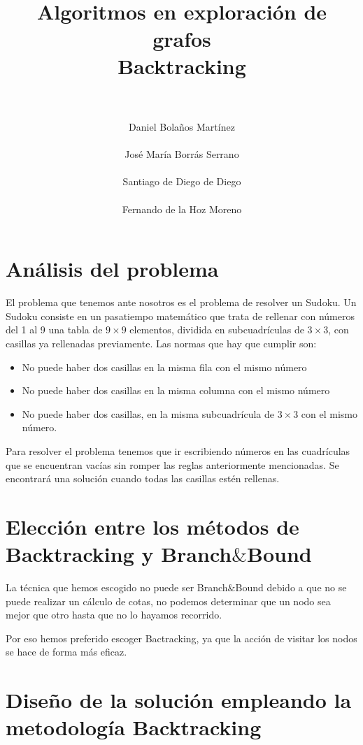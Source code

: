 \documentclass[11pt, a4paper]{article}
\title{
  \normalfont \normalsize 
  \textsc{} \\ [25pt]    %
  \horrule{0.5pt} \\[0.4cm] %
  \huge Algoritmos en exploración de grafos\\ \Large{Backtracking}\\ %
  \horrule{2pt} \\[0.5cm] %
}
\author{\Large{Daniel Bolaños Martínez} 
\\\\
\Large{José María Borrás Serrano}
\\\\
\Large{Santiago de Diego de Diego}
\\\\
\Large{Fernando de la Hoz Moreno}}
\date{\vspace{-1.5em} \normalsize }
\theoremstyle{theorem-style}
\theoremstyle{definition-style}
\theoremstyle{remark-style}
\theoremstyle{example-style}
\begin{document}
\maketitle  %
\vfill
\begin{center}
\end{center}
\newpage
\newpage

\section{Análisis del problema}
El problema que tenemos ante nosotros es el problema de resolver un Sudoku. Un Sudoku consiste en un pasatiempo matemático que trata de rellenar con números del 1 al 9 una tabla de $9\times 9$ elementos, dividida en subcuadrículas de $3\times 3$, con casillas ya rellenadas previamente. Las normas que hay que cumplir son:
\begin{itemize}
\item No puede haber dos casillas en la misma fila con el mismo número
\item No puede haber dos casillas en la misma columna con el mismo número
\item No puede haber dos casillas, en la misma subcuadrícula de $3 \times 3$ con el mismo número.
\end{itemize}
Para resolver el problema tenemos que ir escribiendo números en las cuadrículas que se encuentran vacías sin romper las reglas anteriormente mencionadas. Se encontrará una solución cuando todas las casillas estén rellenas.

\section{Elección entre los métodos de Backtracking y Branch$\&$Bound}

La técnica que hemos escogido no puede ser Branch$\&$Bound debido a que no se puede realizar un cálculo de cotas, no podemos determinar que un nodo sea mejor que otro hasta que no lo hayamos recorrido.

Por eso hemos preferido escoger Bactracking, ya que la acción de visitar los nodos se hace de forma más eficaz.

\section{Diseño de la solución empleando la metodología Backtracking}
\end{document}
